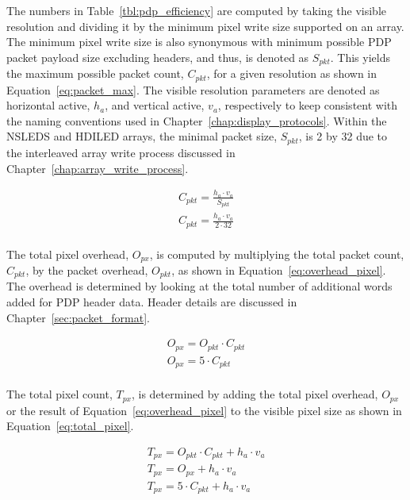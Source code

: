     The numbers in Table~\ref{tbl:pdp_efficiency} are computed by taking the visible resolution and dividing it by the minimum pixel write size supported on an array. The minimum pixel write size is also synonymous with minimum possible PDP packet payload size excluding headers, and thus, is denoted as $S_{pkt}$. This yields the maximum possible packet count, $C_{pkt}$, for a given resolution as shown in Equation~\eqref{eq:packet_max}. The visible resolution parameters are denoted as horizontal active, $h_a$, and vertical active, $v_a$, respectively to keep consistent with the naming conventions used in Chapter~\ref{chap:display_protocols}. Within the NSLEDS and HDILED arrays, the minimal packet size, $S_{pkt}$, is 2 by 32 due to the interleaved array write process discussed in Chapter~\ref{chap:array_write_process}.

    \begin{equation}
        \begin{array}{ l }
            \displaystyle C_{pkt}=\frac{h_a \cdot v_a}{S_{pkt}} \\[13pt]
            \displaystyle C_{pkt}=\frac{h_a \cdot v_a}{2 \cdot 32}\\[13pt]
        \end{array}
        \label{eq:packet_max}
    \end{equation}

    The total pixel overhead, $O_{px}$, is computed by multiplying the total packet count, $C_{pkt}$, by the packet overhead, $O_{pkt}$, as shown in Equation~\eqref{eq:overhead_pixel}. The overhead is determined by looking at the total number of additional words added for PDP header data. Header details are discussed in Chapter~\ref{sec:packet_format}.

    \begin{equation}
        \begin{array}{ l }
            \displaystyle O_{px}=O_{pkt} \cdot C_{pkt} \\
            \displaystyle O_{px}=5\cdot C_{pkt} \\[13pt]
        \end{array}
        \label{eq:overhead_pixel}
    \end{equation}

    The total pixel count, $T_{px}$, is determined by adding the total pixel overhead, $O_{px}$ or the result of Equation~\eqref{eq:overhead_pixel} to the visible pixel size as shown in Equation~\eqref{eq:total_pixel}.

    \begin{equation}
        \begin{array}{ l }
            \displaystyle T_{px}=O_{pkt} \cdot C_{pkt} + h_a \cdot v_a \\
            \displaystyle T_{px}=O_{px} + h_a \cdot v_a \\
            \displaystyle T_{px}=5\cdot C_{pkt} + h_a \cdot v_a \\[13pt]
        \end{array}
        \label{eq:total_pixel}
    \end{equation}


